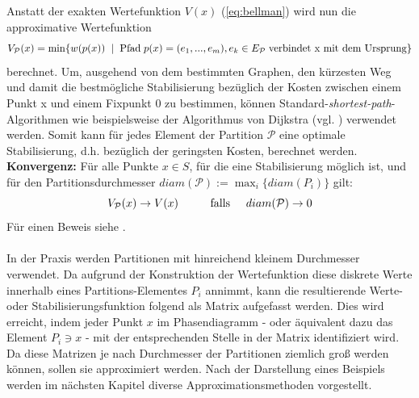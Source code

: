 \documentclass[12pt,a4paper,twoside]{article}
\begin{document}
	Anstatt der exakten Wertefunktion $V(x)$ (\ref{eq:bellman}) wird nun die approximative Wertefunktion
	\begin{equation*}
		V_\mathcal{P}(x)=\min\{w(p(x)) \hspace{2mm}|\hspace{2mm} \text{Pfad}\hspace{1mm} p(x)=(e_1,...,e_m), e_k\in E_\mathcal{P} \hspace{1mm}\text{verbindet x mit dem Ursprung}\}
	\end{equation*}
	berechnet. \newline
	\newline
	Um, ausgehend von dem bestimmten Graphen, den kürzesten Weg und damit die bestmögliche Stabilisierung bezüglich 
	der Kosten zwischen einem Punkt x und einem Fixpunkt $0$ zu bestimmen, können Standard-\textit{shortest-path}-Algorithmen wie beispielsweise der Algorithmus von Dijkstra (vgl. \citep{Dijkstra59}) verwendet werden.
	\newline
	Somit kann für jedes Element der Partition $\mathcal{P}$ eine optimale Stabilisierung, d.h. bezüglich der geringsten Kosten, berechnet werden. \newline
	\newline
	\textbf{Konvergenz:} Für alle Punkte $x\in S$, für die eine Stabilisierung möglich ist, und für den Partitionsdurchmesser $diam(\mathcal{P}):=\max_i\{diam(P_i)\}$ gilt:
	\begin{equation*}
		V_\mathcal{P}(x)\rightarrow V(x) \hspace{1cm} \text{falls} \hspace{0.5cm} diam(\mathcal{P})\rightarrow 0
	\end{equation*}
	Für einen Beweis siehe \cite{Junge2004}. \\
	\\
	In der Praxis werden Partitionen mit hinreichend kleinem Durchmesser verwendet. Da aufgrund der Konstruktion der 
	Wertefunktion diese diskrete Werte innerhalb eines Partitions-Elementes $P_i$ annimmt, kann die resultierende 
	Werte- oder Stabilisierungsfunktion folgend als Matrix aufgefasst werden. Dies wird erreicht, indem jeder Punkt 
	$x$ im Phasendiagramm - oder äquivalent dazu das Element $P_i\ni x$ - mit der entsprechenden Stelle in der Matrix identifiziert wird. \\
	Da diese Matrizen je nach Durchmesser der Partitionen ziemlich groß werden können, sollen sie approximiert 
	werden. Nach der Darstellung eines Beispiels werden im nächsten Kapitel diverse Approximationsmethoden vorgestellt.
\end{document}
